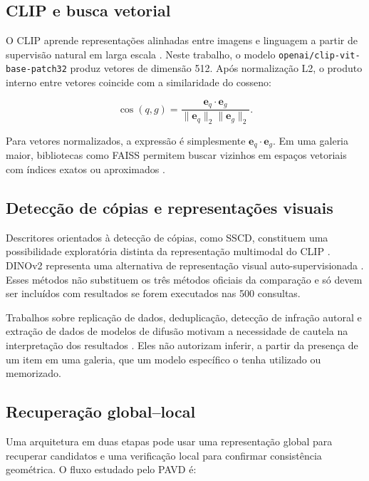 \documentclass[12pt]{article}
\newcommand{\pavd}{PAVD}
\newcommand{\faiss}{FAISS}
\begin{document}
\subsection{CLIP e busca vetorial}

O CLIP aprende representações alinhadas entre imagens e linguagem a partir de
supervisão natural em larga escala \cite{radford2021clip}. Neste trabalho, o
modelo \texttt{openai/clip-vit-base-patch32} produz vetores de dimensão 512.
Após normalização L2, o produto interno entre vetores coincide com a
similaridade do cosseno:

\begin{equation}
\operatorname{cos}(q,g)=
\frac{\mathbf{e}_q\cdot\mathbf{e}_g}
{\lVert\mathbf{e}_q\rVert_2\lVert\mathbf{e}_g\rVert_2}.
\label{eq:cosine}
\end{equation}

Para vetores normalizados, a expressão é simplesmente
$\mathbf{e}_q\cdot\mathbf{e}_g$. Em uma galeria maior, bibliotecas como
\faiss{} permitem buscar vizinhos em espaços vetoriais com índices exatos ou
aproximados \cite{johnson2019faiss}.

\subsection{Detecção de cópias e representações visuais}

Descritores orientados à detecção de cópias, como SSCD, constituem uma
possibilidade exploratória distinta da representação multimodal do CLIP
\cite{pizzi2022sscd}. DINOv2 representa uma alternativa de representação
visual auto-supervisionada \cite{oquab2024dinov2}. Esses métodos não
substituem os três métodos oficiais da comparação e só devem ser incluídos
com resultados se forem executados nas 500 consultas.

Trabalhos sobre replicação de dados, deduplicação, detecção de infração
autoral e extração de dados de modelos de difusão motivam a necessidade de
cautela na interpretação dos resultados
\cite{somepalli2023diffusion,carlini2023extracting,webster2023deduplication,
huang2025mcid}.
Eles não autorizam inferir, a partir da presença de um item em uma galeria,
que um modelo específico o tenha utilizado ou memorizado.

\subsection{Recuperação global--local}

Uma arquitetura em duas etapas pode usar uma representação global para
recuperar candidatos e uma verificação local para confirmar consistência
geométrica. O fluxo estudado pelo \pavd{} é:
\end{document}

